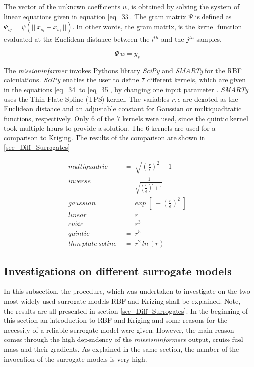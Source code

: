 The vector of the unknown coefficients $w$, is obtained by 
solving the system of linear equations given in equation 
\eqref{eq_33}. The gram matrix $\Psi$ is defined as 
$\Psi_{ij} = \psi(|| \, x_{s_i} - x_{s_j}\, ||)$. In other 
words, the gram matrix, is the kernel function evaluated 
at the Euclidean distance between the $i^{th}$ and the 
$j^{th}$ samples. 

\begin{equation}
    \label{eq_33}
    \Psi \, w = y_s
\end{equation}


The \emph{missioninformer} invokes 
Pythons library \emph{SciPy} and \emph{SMARTy} for the RBF calculations. 
\emph{SciPy} enables the user to define $7$ different kernels, 
which are given in 
the equations \eqref{eq_34} to \eqref{eq_35}, 
by changing one input parameter 
\cite{noauthor_rbf_2021}. \emph{SMARTy} uses 
the Thin Plate Spline (TPS) kernel.
The variables $r, \epsilon$ are denoted 
as the Euclidean distance and an adjustable constant 
for Gaussian or multiquadtratic functions,
respectively. Only $6$ of the $7$ kernels were used,
since the quintic kernel took multiple 
hours to provide a solution. The $6$ kernels are used for a 
comparison to 
Kriging. The results of the comparison 
are shown in \ref{sec_Diff_Surrogates}


\begin{align}
    multiquadric &\;=\;  \sqrt{\left(\frac{r}{\epsilon}\right)^2 + 1}  \label{eq_34}\\
    inverse &\;=\; \frac{1}{ \sqrt{\left(\dfrac{r}{\epsilon}\right)^2 + 1}} \\
    gaussian &\;=\; exp \;[\;- \left(\frac{r}{\epsilon}\right)^2\;] \\
    linear &\;=\;  r \\
    cubic &\;=\;  r^3 \\
    quintic &\;=\;  r^5\\
    thin\, plate\, spline &\;=\;  r^2 \, ln\,(r) \label{eq_35}
\end{align}


\newpage

\subsection{Investigations on different surrogate models}
\label{subsec_INvestigate_Surro}

In this subsection, the procedure, which was undertaken to 
investigate on the two most widely used 
surrogate models RBF and Kriging shall be explained.
Note, the results are all presented in section 
\ref{sec_Diff_Surrogates}. In the beginning 
of this section an introduction to RBF 
and Kriging and some 
reasons for the necessity of a reliable 
surrogate model were given. 
However,
the main reason comes through the high dependency 
of the \emph{missioninformers} output, cruise fuel mass and their 
gradients. As explained in the same section,
the number of the invocation of the surrogate models 
is very high. \newline 

